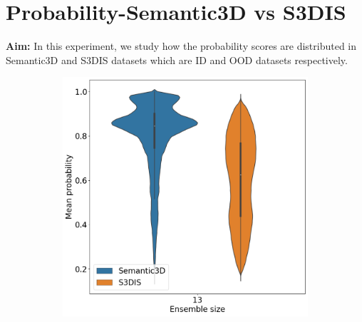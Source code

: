     \section{Probability-Semantic3D vs S3DIS}
    \label{sec:prob_sem3dvs3dis}
    \textbf{Aim: } In this experiment, we study how the probability scores are distributed in Semantic3D and S3DIS datasets which are ID and OOD datasets respectively.
    \begin{figure}[htbp]
        \begin{subfigure}{0.54\textwidth}
            
            \caption{}
            \label{fig:prob_sem3dvs3dis}    
        \end{subfigure}
        \begin{subfigure}{0.45\textwidth}
            \includegraphics[scale=0.33]{images/violin_in_Max_predicted_probability.png}
            \caption{}
            \label{fig:13_sem3dvs3dis}
        \end{subfigure}
    \end{figure}


